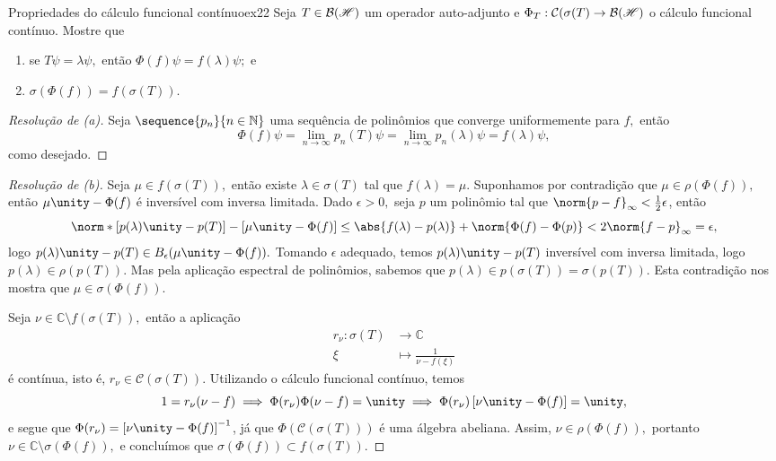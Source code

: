 \begin{exercício}{Propriedades do cálculo funcional contínuo}{ex22}
  Seja \(T \in \mathcal{B}(\mathscr{H})\) um operador auto-adjunto e \(\Phi_T : \mathcal{C}(\sigma(T) \to \mathcal{B}(\mathscr{H})\) o cálculo funcional contínuo. Mostre que
  \begin{enumerate}[label=(\alph*)]
      \item se \(T \psi = \lambda \psi,\) então \(\Phi(f)\psi = f(\lambda)\psi;\) e
      \item \(\sigma(\Phi(f)) = f(\sigma(T)).\)
  \end{enumerate}
\end{exercício}
\begin{proof}[Resolução de (a)]
  Seja \(\sequence{p_n}{n\in\mathbb{N}}\) uma sequência de polinômios que converge uniformemente para \(f,\) então
  \begin{equation*}
    \Phi(f)\psi = \lim_{n\to\infty} p_n(T)\psi = \lim_{n\to\infty} p_n(\lambda)\psi = f(\lambda)\psi,
  \end{equation*}
  como desejado.
\end{proof}
\begin{proof}[Resolução de (b)]
  Seja \(\mu\in f(\sigma(T)),\) então existe \(\lambda \in \sigma(T)\) tal que \(f(\lambda) = \mu.\) Suponhamos por contradição que \(\mu \in \rho(\Phi(f)),\) então \(\mu\unity - \Phi(f)\) é inversível com inversa limitada. Dado \(\epsilon > 0,\) seja \(p\) um polinômio tal que \(\norm{p - f}_\infty < \frac12 \epsilon\), então
  \begin{equation*}
    \norm*{\left[p(\lambda)\unity - p(T)\right] - \left[\mu\unity - \Phi(f)\right]} \leq \abs{f(\lambda) - p(\lambda)} + \norm{\Phi(f) - \Phi(p)} < 2 \norm{f - p}_\infty = \epsilon,
  \end{equation*}
  logo \(p(\lambda)\unity - p(T) \in B_{\epsilon}(\mu \unity - \Phi(f)).\) Tomando \(\epsilon\) adequado, temos \(p(\lambda)\unity - p(T)\) inversível com inversa limitada, logo \(p(\lambda) \in \rho(p(T)).\) Mas pela aplicação espectral de polinômios, sabemos que \(p(\lambda) \in p(\sigma(T)) = \sigma(p(T)).\) Esta contradição nos mostra que \(\mu \in \sigma(\Phi(f)).\)

  Seja \(\nu \in \mathbb{C} \setminus f(\sigma(T)),\) então a aplicação
  \begin{align*}
    r_\nu : \sigma(T) &\to \mathbb{C}\\
                  \xi &\mapsto \frac{1}{\nu - f(\xi)}
  \end{align*}
  é contínua, isto é, \(r_\nu \in \mathcal{C}(\sigma(T)).\) Utilizando o cálculo funcional contínuo, temos
  \begin{equation*}
    1 = r_\nu (\nu - f) \implies \Phi(r_\nu) \Phi(\nu - f) = \unity \implies \Phi(r_\nu)\left[\nu \unity - \Phi(f)\right] = \unity,
  \end{equation*}
  e segue que \(\Phi(r_\nu) = \left[\nu\unity - \Phi(f)\right]^{-1}\), já que \(\Phi(\mathcal{C}(\sigma(T)))\) é uma álgebra abeliana. Assim, \(\nu \in \rho(\Phi(f)),\) portanto \(\nu \in \mathbb{C} \setminus \sigma(\Phi(f)),\) e concluímos que \(\sigma(\Phi(f)) \subset f(\sigma(T)).\)
\end{proof}
